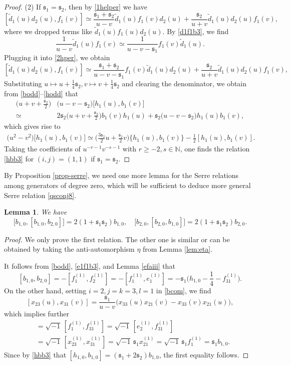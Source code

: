\documentclass[11pt,reqno]{amsart}
\numberwithin{equation}{section}
\newtheorem{lem}[thm]{Lemma}
\theoremstyle{definition}
\theoremstyle{remark}
\newcommand{\beq}{\begin{equation}}
\newcommand{\eeq}{\end{equation}}
\newcommand{\bN}{\mathbb{N}}
\newcommand{\tl}{\tilde}
\newcommand{\gge}{\geqslant}
\newcommand{\ka}{{\mathfrak s}}
\begin{document}
\begin{proof}
(2) If $\ka_1=\ka_2$, then by \eqref{1helper} we have
\beq\label{2hper}
[\tl d_1(u)d_2(u),f_1(v)]\simeq\frac{\ka_1+\ka_2}{u-v}\tl d_1(u)f_1(v)d_2(u)+\frac{\ka_2}{u+v}\tl d_1(u)d_2(u)f_1(v),
\eeq
where we dropped terms like $\tl d_1(u)f_1(u)d_2(u)$. By \eqref{d1f1b3}, we find
\[
\frac{1}{u-v}\tl d_1(u)f_1(v)\simeq \frac{1}{u-v-\ka_1}f_1(v)\tl d_1(u).
\]
Plugging it into \eqref{2hper}, we obtain
\[
[\tl d_1(u)d_2(u),f_1(v)]\simeq\frac{\ka_1+\ka_2}{u-v-\ka_1}f_1(v)\tl d_1(u)d_2(u)+\frac{\ka_2}{u+v}\tl d_1(u)d_2(u)f_1(v),
\]
Substituting $u\mapsto u+\frac{1}4\ka_2, v\mapsto v+\frac{1}{4}\ka_2$ and clearing the denominator, we obtain from \eqref{bodd}--\eqref{hodd} that
\begin{align*}\Big(u+v+\frac{\ka_2}{2}\Big)&\big(u-v-\ka_2\big)\big[h_1(u),b_1(v)\big]\\
\simeq\,&2\ka_2\Big(u+v+\frac{\ka_2}{2}\Big)b_1(v)h_1(u)+\ka_2\big(u-v-\ka_2\big)h_1(u)b_1(v),
\end{align*}
which gives rise to
\begin{align*}
\big(u^2-v^2\big)\big[h_1(u),b_1(v)\big]
\simeq \Big(\frac{3\ka_2}{2}u+\frac{\ka_2}{2}v\Big)\big\{h_1(u),b_1(v)\big\}-\frac{1}{2}[h_1(u),b_1(v)].                               
\end{align*}
Taking the coefficients of $u^{-r-1}v^{-s-1}$ with $r\gge -2,s\in\bN$, one finds the relation \eqref{hbb3} for $(i,j)=(1,1)$ if $\ka_1=\ka_2$.
\end{proof}

By Proposition \ref{prop-serre}, we need one more lemma for the Serre relations among generators of degree zero, which will be
sufficient to deduce more general Serre relation \eqref{qsconj8}.
\begin{lem}\label{fin-serre}
We have
\[
\big[b_{1,0},[b_{1,0},b_{2,0}]\big]=2(1+\ka_1\ka_2)b_{1,0},\quad \big[b_{2,0},[b_{2,0},b_{1,0}]\big]=2(1+\ka_1\ka_2)b_{2,0}.
\]
\end{lem}
\begin{proof}
We only prove the first relation. The other one is similar or can be obtained by taking the anti-automorphism $\eta$ from Lemma \ref{lem:eta}.

It follows from  \eqref{bodd}, \eqref{e1f1b3}, and Lemma \ref{efaiii} that
\[
[b_{1,0},b_{2,0}]=-[f_1^{(1)},f_2^{(1)}]=-[f_1^{(1)},e_1^{(1)}]=-\ka_1\Big(h_{1,0}-\frac{1}4-f_{31}^{(1)}\Big).
\]
On the other hand, setting $i=2,j=k=3,l=1$ in \eqref{bcom}, we find
\[
[x_{23}(u),x_{31}(v)]=\frac{\ka_1}{u-v}\big(x_{33}(u)x_{21}(v)-x_{33}(v)x_{21}(u)\big),
\]
which implies further
\begin{align*}
[b_{1,0},f_{31}^{(1)}]&=\sqrt{-1}\,[f_{1}^{(1)},f_{31}^{(1)}]=\sqrt{-1}\,[e_{2}^{(1)},f_{31}^{(1)}]\\&=\sqrt{-1}\,[x_{23}^{(1)},x_{31}^{(1)}]=\sqrt{-1}\,\ka_1x_{21}^{(1)} =\sqrt{-1}\,\ka_1f_1^{(1)}=\ka_1b_{1,0}.
\end{align*}
Since by \eqref{hbb3} that $[h_{1,0},b_{1,0}]=(\ka_1+2\ka_2)b_{1,0}$, the first equality follows.
\end{proof}
\end{document}
